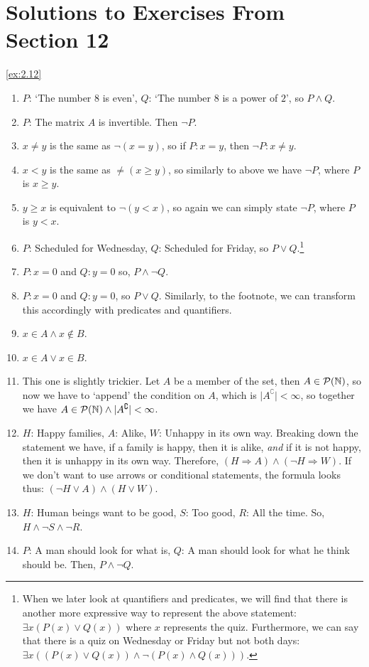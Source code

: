 \section*{Solutions to Exercises From Section 12}
\begin{solution}\label{sol:2.12}\ref{ex:2.12}
    \begin{enumerate}
        \item $P$: `The number $8$ is even', $Q$: `The number $8$ is a power of $2$', so $P\land Q$. 
        \item $P$: The matrix $A$ is invertible. Then $\neg P$. 
        \item $x\ne y$ is the same as $\neg(x=y)$, so if $P:x=y$, then $\neg P:x\ne y$. 
        \item $x < y$ is the same as $\ne(x\ge y)$, so similarly to above we have $\neg P$, where $P$ is $x\ge y$. 
        \item $y\ge x$ is equivalent to $\neg(y<x)$, so again we can simply state $\neg P$, where $P$ is $y<x$. 
        \item $P$: Scheduled for Wednesday, $Q$: Scheduled for Friday, so $P\lor Q$.\footnote{When we later look at quantifiers and predicates, we will find that there is another more expressive way to represent the above statement: $\exists x(P(x)\lor Q(x))$ where $x$ represents the quiz. Furthermore, we can say that there is a quiz on Wednesday or Friday but not both days: $\exists x((P(x)\lor Q(x))\land \neg(P(x)\land Q(x)))$.}
        \item $P:x=0$ and $Q:y=0$ so, $P\land\neg Q$. 
        \item $P:x=0$ and $Q:y=0$, so $P\lor Q$. Similarly, to the footnote, we can transform this accordingly with predicates and quantifiers. 
        \item $x\in A\land x\notin B$.
        \item $x\in A\lor x\in B$.
        \item This one is slightly trickier. Let $A$ be a member of the set, then $A\in\mathcal{P}(\mathbb{N})$, so now we have to `append' the condition on $A$, which is $\lvert A^{\complement} \rvert<\infty$, so together we have $A\in\mathcal{P}(\mathbb{N})\land \lvert A^{\complement} \rvert<\infty$.
        \item $H$: Happy families, $A$: Alike, $W$: Unhappy in its own way. Breaking down the statement we have, if a family is happy, then it is alike, \emph{and} if it is not happy, then it is unhappy in its own way. Therefore, $(H\Rightarrow A)\land(\neg H\Rightarrow W)$. If we don't want to use arrows or conditional statements, the formula looks thus: $(\neg H\lor A)\land (H\lor W)$.
        \item $H$: Human beings want to be good, $S$: Too good, $R$: All the time. So, $H\land \neg S \land \neg R$. 
        \item $P$: A man should look for what is, $Q$: A man should look for what he think should be. Then, $P\land \neg Q$.
    \end{enumerate}
\end{solution}